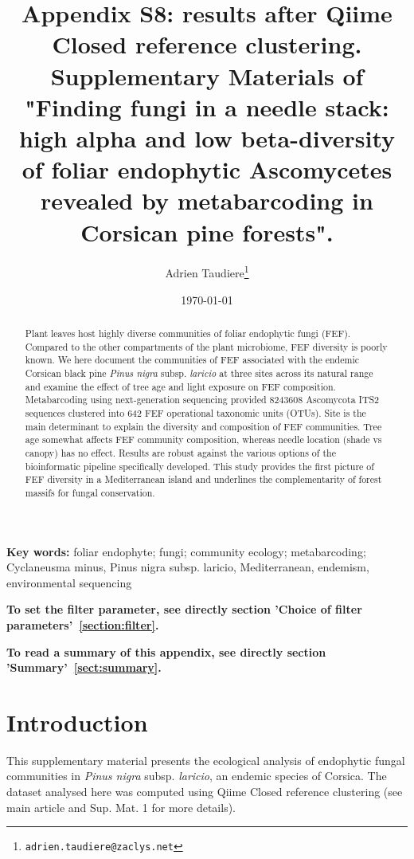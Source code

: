 \documentclass[12pt]{article}\usepackage[]{graphicx}\usepackage[]{color}
\title{Appendix S8: results after Qiime Closed reference clustering. Supplementary Materials of "Finding fungi in a needle stack: high alpha and low beta-diversity of foliar endophytic Ascomycetes revealed by metabarcoding in Corsican pine forests".}
\author{Adrien Taudiere\thanks{\texttt{adrien.taudiere@zaclys.net}}}
\affil{{\footnotesize CEFE - Centre d'Ecologie Fonctionnelle et Evolutive, Montpellier: France}}
\date{\today}
\numberwithin{figure}{section}
\begin{document}






\maketitle

\begin{abstract}

Plant leaves host highly diverse communities of foliar endophytic fungi (FEF). Compared to the other compartments of the plant microbiome, FEF diversity is poorly known. We here document the communities of FEF associated with the endemic Corsican black pine \textit{Pinus nigra} subsp. \textit{laricio} at three sites across its natural range and examine the effect of tree age and light exposure on FEF composition. Metabarcoding using next-generation sequencing provided 8243608 Ascomycota ITS2 sequences clustered into 642 FEF operational taxonomic units (OTUs). Site is the main determinant to explain the diversity and composition of FEF communities. Tree age somewhat affects FEF community composition, whereas needle location (shade vs canopy) has no effect. Results are robust against the various options of the bioinformatic pipeline specifically developed. This study provides the first picture of FEF diversity in a Mediterranean island and underlines the complementarity of forest massifs for fungal conservation.

\end{abstract}


\textbf{Key words:} foliar endophyte; fungi; community ecology; metabarcoding; Cyclaneusma minus, Pinus nigra subsp. laricio, Mediterranean, endemism, environmental sequencing


\vfill
\begin{center}
\textbf{To set the filter parameter, see directly section 'Choice of filter parameters'~\ref{section:filter}.}

\textbf{To read a summary of this appendix, see directly section 'Summary'~\ref{sect:summary}.}
\end{center}

\newpage
\tableofcontents
\newpage


\section{Introduction}

This supplementary material presents the ecological analysis of endophytic fungal communities in \textit{Pinus nigra} subsp. \textit{laricio}, an endemic species of Corsica. The dataset analysed here was computed using Qiime Closed reference clustering (see main article and Sup. Mat. 1 for more details).
\end{document}
